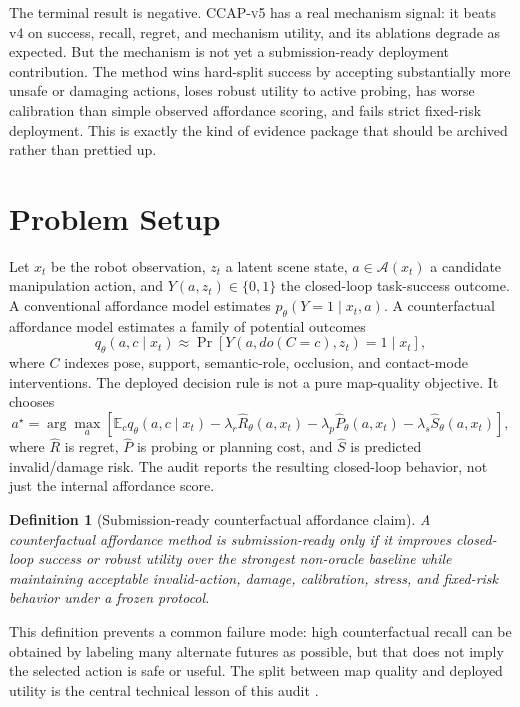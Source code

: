 \documentclass{article}
\newtheorem{definition}{Definition}
\newcommand{\method}{\textsc{CCAP-v5}}
\begin{document}
The terminal result is negative. \method{} has a real mechanism signal: it beats v4 on success, recall, regret, and mechanism utility, and its ablations degrade as expected. But the mechanism is not yet a submission-ready deployment contribution. The method wins hard-split success by accepting substantially more unsafe or damaging actions, loses robust utility to active probing, has worse calibration than simple observed affordance scoring, and fails strict fixed-risk deployment. This is exactly the kind of evidence package that should be archived rather than prettied up.

\section{Problem Setup}
Let $x_t$ be the robot observation, $z_t$ a latent scene state, $a\in\mathcal{A}(x_t)$ a candidate manipulation action, and $Y(a,z_t)\in\{0,1\}$ the closed-loop task-success outcome. A conventional affordance model estimates $p_\theta(Y=1\mid x_t,a)$. A counterfactual affordance model estimates a family of potential outcomes
\[
  q_\theta(a, c\mid x_t) \approx \Pr\left[Y(a, do(C=c), z_t)=1\mid x_t\right],
\]
where $C$ indexes pose, support, semantic-role, occlusion, and contact-mode interventions. The deployed decision rule is not a pure map-quality objective. It chooses
\[
  a^\star = \arg\max_a \left[\mathbb{E}_c q_\theta(a,c\mid x_t) - \lambda_r \widehat{R}_\theta(a,x_t) - \lambda_p \widehat{P}_\theta(a,x_t) - \lambda_s \widehat{S}_\theta(a,x_t)\right],
\]
where $\widehat{R}$ is regret, $\widehat{P}$ is probing or planning cost, and $\widehat{S}$ is predicted invalid/damage risk. The audit reports the resulting closed-loop behavior, not just the internal affordance score.

\begin{definition}[Submission-ready counterfactual affordance claim]
A counterfactual affordance method is submission-ready only if it improves closed-loop success or robust utility over the strongest non-oracle baseline while maintaining acceptable invalid-action, damage, calibration, stress, and fixed-risk behavior under a frozen protocol.
\end{definition}

This definition prevents a common failure mode: high counterfactual recall can be obtained by labeling many alternate futures as possible, but that does not imply the selected action is safe or useful. The split between map quality and deployed utility is the central technical lesson of this audit \citep{r101109iccvw60793202300504,r101109icra55743202511127525,r103390rs15112796,r103390rs17010139,r1011770278364908091366,r101109thms20162558539,r103390electronics9010107,r101109icra20198793508}.
\end{document}
